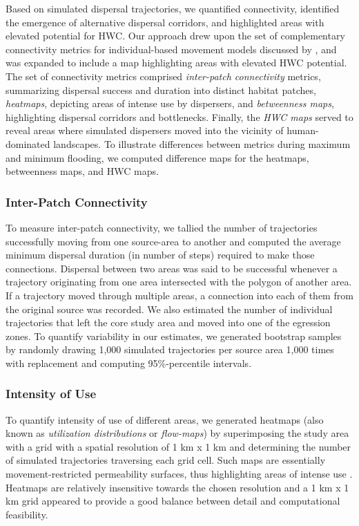 \documentclass[../FinalThesis.tex]{subfiles}
\begin{document}
Based on simulated dispersal trajectories, we quantified connectivity,
identified the emergence of alternative dispersal corridors, and highlighted
areas with elevated potential for HWC. Our approach drew upon the set of
complementary connectivity metrics for individual-based movement models
discussed by \citet{Hofmann.2023}, and was expanded to include a map
highlighting areas with elevated HWC potential. The set of connectivity metrics
comprised \textit{inter-patch connectivity} metrics, summarizing dispersal
success and duration into distinct habitat patches, \textit{heatmaps}, depicting
areas of intense use by dispersers, and \textit{betweenness maps}, highlighting
dispersal corridors and bottlenecks. Finally, the \textit{HWC maps} served to
reveal areas where simulated dispersers moved into the vicinity of
human-dominated landscapes. To illustrate differences between metrics during
maximum and minimum flooding, we computed difference maps for the heatmaps,
betweenness maps, and HWC maps.

\subsubsection{Inter-Patch Connectivity}

To measure inter-patch connectivity, we tallied the number of trajectories
successfully moving from one source-area to another and computed the average
minimum dispersal duration (in number of steps) required to make those
connections. Dispersal between two areas was said to be successful whenever a
trajectory originating from one area intersected with the polygon of another
area. If a trajectory moved through multiple areas, a connection into each of
them from the original source was recorded. We also estimated the number of
individual trajectories that left the core study area and moved into one of the
egression zones. To quantify variability in our estimates, we generated
bootstrap samples by randomly drawing 1,000 simulated trajectories per source
area 1,000 times with replacement and computing 95\%-percentile intervals.

\subsubsection{Intensity of Use}

To quantify intensity of use of different areas, we generated heatmaps (also
known as \textit{utilization distributions} or \textit{flow-maps}) by
superimposing the study area with a grid with a spatial resolution of 1 km x 1
km and determining the number of simulated trajectories traversing each grid
cell. Such maps are essentially movement-restricted permeability surfaces, thus
highlighting areas of intense use \citep{Signer.2017, Potts.2023, Hofmann.2023}.
Heatmaps are relatively insensitive towards the chosen resolution and a 1 km x 1
km grid appeared to provide a good balance between detail and computational
feasibility.
\end{document}
